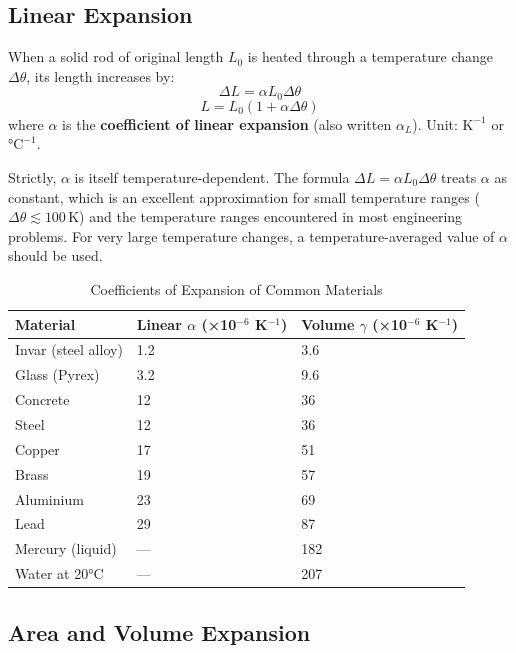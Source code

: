 \subsection{Linear Expansion}

\begin{lawbox}
When a solid rod of original length $L_0$ is heated
through a temperature change $\Delta\theta$, its
length increases by:
\[
  \Delta L = \alpha L_0 \Delta\theta
\]
\[
  L = L_0(1 + \alpha\Delta\theta)
\]
where $\alpha$ is the \textbf{coefficient of linear
expansion} (also written $\alpha_L$). Unit:
$\text{K}^{-1}$ or $°\text{C}^{-1}$.

\begin{notebox}
Strictly, $\alpha$ is itself temperature-dependent.
The formula $\Delta L = \alpha L_0 \Delta\theta$
treats $\alpha$ as constant, which is an excellent
approximation for small temperature ranges
($\Delta\theta \lesssim 100\,\text{K}$) and the
temperature ranges encountered in most engineering
problems. For very large temperature changes, a
temperature-averaged value of $\alpha$ should be used.
\end{notebox}
\end{lawbox}

\begin{table}[H]
\centering
\caption{Coefficients of Expansion of Common Materials}
\label{tab:expansion}
\begin{tabular}{lll}
\toprule
\textbf{Material} & \textbf{Linear $\alpha$
(×10$^{-6}$ K$^{-1}$)} & \textbf{Volume $\gamma$
(×10$^{-6}$ K$^{-1}$)}\\
\midrule
Invar (steel alloy) & 1.2 & 3.6\\
Glass (Pyrex) & 3.2 & 9.6\\
Concrete & 12 & 36\\
Steel & 12 & 36\\
Copper & 17 & 51\\
Brass & 19 & 57\\
Aluminium & 23 & 69\\
Lead & 29 & 87\\
Mercury (liquid) & --- & 182\\
Water at 20°C & --- & 207\\
\bottomrule
\end{tabular}
\end{table}

\subsection{Area and Volume Expansion}

